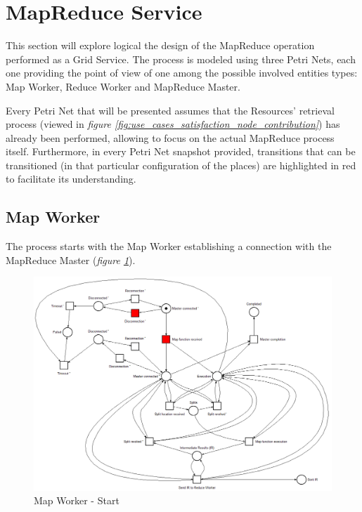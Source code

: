 \section{MapReduce Service}\label{mapreduce_service}
This section will explore logical the design of the MapReduce operation performed as a Grid Service. The process is modeled using three Petri Nets, each one providing the point of view of one among the possible involved entities types: Map Worker, Reduce Worker and MapReduce Master.

Every Petri Net that will be presented assumes that the Resources' retrieval process (viewed in \textit{figure \ref{fig:use_cases_satisfaction_node_contribution}}) has already been performed, allowing to focus on the actual MapReduce process itself.
Furthermore, in every Petri Net snapshot provided, transitions that can be transitioned (in that particular configuration of the places) are highlighted in red to facilitate its understanding.
  
\subsection{Map Worker}
The process starts with the Map Worker establishing a connection with the MapReduce Master (\textit{figure \ref{fig:map_worker_petri_net_1}}).

\vspace{5mm}

\begin{figure}[!ht]
    \centering
    \includegraphics[width=\linewidth]{document/chapters/chapter_6/images/map_worker_petri_net_1.png}
    \caption{Map Worker - Start}
    \label{fig:map_worker_petri_net_1}
\end{figure}

